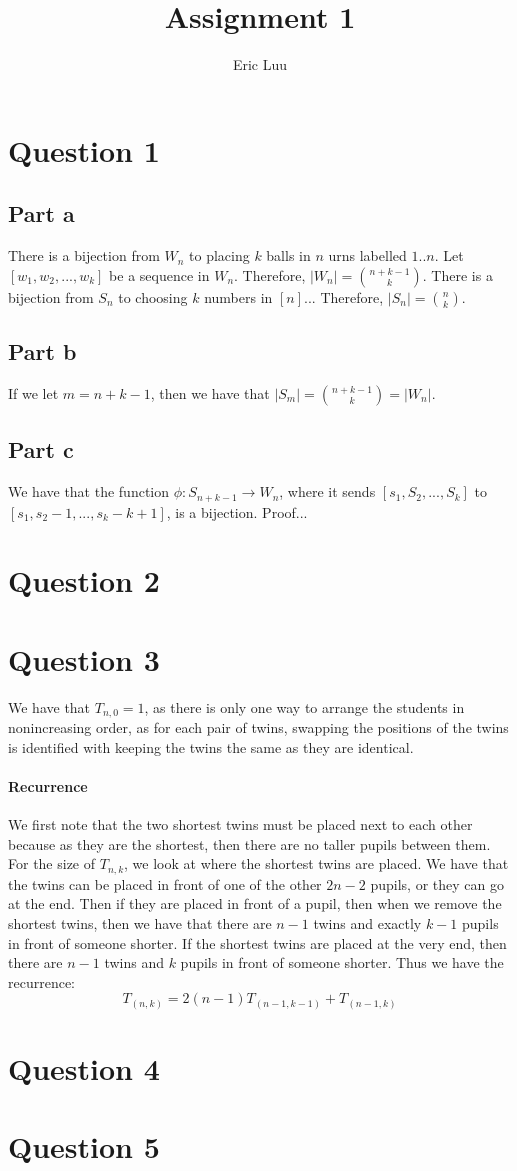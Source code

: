 \documentclass[]{article}
\title{Assignment 1}
\author{Eric Luu}
\begin{document}
\maketitle
\section{Question 1}
\subsection{Part a}
There is a bijection from $W_n$ to placing $k$ balls in $n$ urns labelled $1 .. n$. Let $[w_1, w_2, ..., w_{k}]$ be a sequence in $W_n$.
Therefore, $|W_n| = \binom{n + k - 1}{k}$. 
There is a bijection from $S_n$ to choosing $k$ numbers in $[n]$...
Therefore, $|S_n| = \binom{n}{k}$. 
\subsection{Part b}
If we let $m = n + k - 1$, then we have that $|S_m| = \binom{n + k - 1}{k} = |W_n|$. 
\subsection{Part c}
We have that the function $\phi: S_{n + k - 1} \rightarrow W_n$, where it sends $[s_1, S_2, ..., S_{k}]$ to $[s_1, s_2 - 1, ..., s_{k} - k + 1]$, is a bijection. Proof...
\section{Question 2}
\section{Question 3}
We have that $T_{n, 0} = 1$, as there is only one way to arrange the students in nonincreasing order, as for each pair of twins, swapping the positions of the twins is identified with keeping the twins the same as they are identical. 
\paragraph{Recurrence}
We first note that the two shortest twins must be placed next to each other because as they are the shortest, then there are no taller pupils between them. 
For the size of $T_{n, k}$, we look at where the shortest twins are placed. We have that the twins can be placed in front of one of the other $2n - 2$ pupils, or they can go at the end. Then if they are placed in front of a pupil, then when we remove the shortest twins, then we have that there are $n-1$ twins and exactly $k-1$ pupils in front of someone shorter. If the shortest twins are placed at the very end, then there are $n-1$ twins and $k$ pupils in front of someone shorter. Thus we have the recurrence:
\begin{equation}
	T_{(n, k)} = 2(n-1) T_{(n-1, k-1)} + T_{(n-1, k)}
\end{equation}
\section{Question 4}
\section{Question 5}
\end{document}
